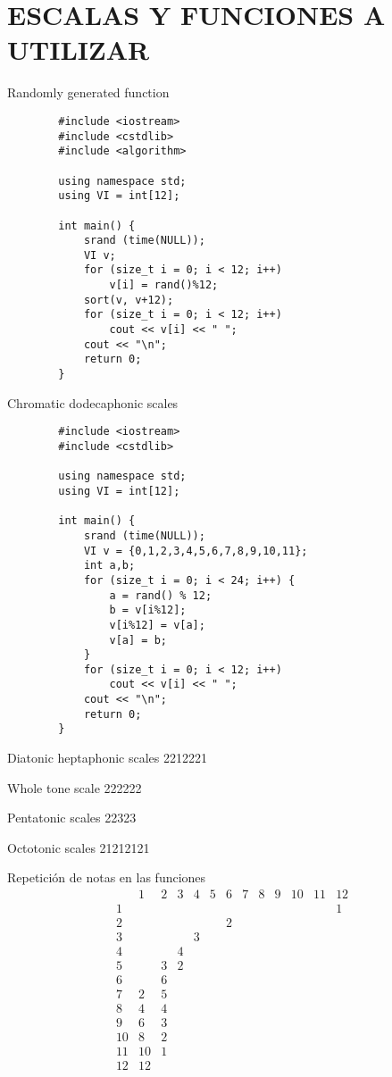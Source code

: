 	\section{ESCALAS Y FUNCIONES A UTILIZAR}

        Randomly generated function
        \begin{lstlisting}
        #include <iostream>
        #include <cstdlib>
        #include <algorithm>
        
        using namespace std;
        using VI = int[12];
        
        int main() {
        	srand (time(NULL));
        	VI v;
        	for (size_t i = 0; i < 12; i++)
        		v[i] = rand()%12;
        	sort(v, v+12);
        	for (size_t i = 0; i < 12; i++)
        		cout << v[i] << " ";
        	cout << "\n";
        	return 0;
        }        
        \end{lstlisting}

        Chromatic dodecaphonic scales
        \begin{lstlisting}
        #include <iostream>
        #include <cstdlib>
        
        using namespace std;
        using VI = int[12];
        
        int main() {
        	srand (time(NULL));
        	VI v = {0,1,2,3,4,5,6,7,8,9,10,11};
        	int a,b;
        	for (size_t i = 0; i < 24; i++) {
        		a = rand() % 12;
        		b = v[i%12];
        		v[i%12] = v[a];
        		v[a] = b;
        	}
        	for (size_t i = 0; i < 12; i++)
        		cout << v[i] << " ";
        	cout << "\n";
        	return 0;
        }        
        \end{lstlisting}

        Diatonic heptaphonic scales
        2212221

        Whole tone scale
        222222

        Pentatonic scales
        22323

        Octotonic scales
        21212121

        Repetición de notas en las funciones
                $$
    \begin{array}{l|rrrrrrrrrrrr}&1&2&3&4&5&6&7&8&9&10&11&12\\\hline1&&&&&&&&&&&&1\\\hline2&&&&&&2\\\hline3&&&&3\\\hline4&&&4\\\hline5&&3&2\\\hline6&&6\\\hline7&2&5\\\hline8&4&4\\\hline9&6&3\\\hline10&8&2\\\hline11&10&1\\\hline12&12&\\\end{array}
                $$
